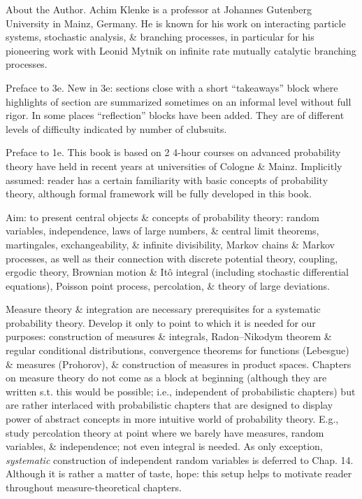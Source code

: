 \documentclass{article}
\begin{document}
\begin{enumerate}
	{\sf About the Author.} {\sc Achim Klenke} is a professor at Johannes Gutenberg University in Mainz, Germany. He is known for his work on interacting particle systems, stochastic analysis, \& branching processes, in particular for his pioneering work with {\sc Leonid Mytnik} on infinite rate mutually catalytic branching processes.
	
	{\sf Preface to 3e.} New in 3e: sections close with a short ``takeaways'' block where highlights of section are summarized sometimes on an informal level without full rigor. In some places ``reflection'' blocks have been added. They are of different levels of difficulty indicated by number of clubsuits.
	
	{\sf Preface to 1e.} This book is based on 2 4-hour courses on advanced probability theory have held in recent years at universities of Cologne \& Mainz. Implicitly assumed: reader has a certain familiarity with basic concepts of probability theory, although formal framework will be fully developed in this book.
	
	Aim: to present central objects \& concepts of probability theory: random variables, independence, laws of large numbers, \& central limit theorems, martingales, exchangeability, \& infinite divisibility, Markov chains \& Markov processes, as well as their connection with discrete potential theory, coupling, ergodic theory, Brownian motion \& It\^o integral (including stochastic differential equations), Poisson point process, percolation, \& theory of large deviations.
	
	Measure theory \& integration are necessary prerequisites for a systematic probability theory. Develop it only to point to which it is needed for our purposes: construction of measures \& integrals, Radon--Nikodym theorem \& regular conditional distributions, convergence theorems for functions (Lebesgue) \& measures (Prohorov), \& construction of measures in product spaces. Chapters on measure theory do not come as a block at beginning (although they are written s.t. this would be possible; i.e., independent of probabilistic chapters) but are rather interlaced with probabilistic chapters that are designed to display power of abstract concepts in more intuitive world of probability theory. E.g., study percolation theory at point where we barely have measures, random variables, \& independence; not even integral is needed. As only exception, {\it systematic} construction of independent random variables is deferred to Chap. 14. Although it is rather a matter of taste, hope: this setup helps to motivate reader throughout measure-theoretical chapters.
	

\end{enumerate}
\end{document}
